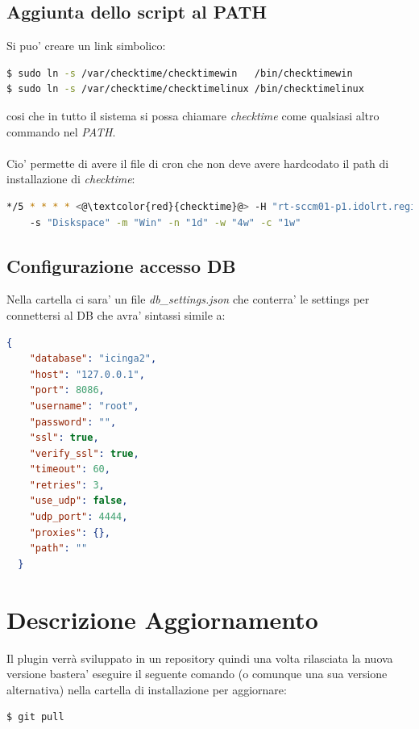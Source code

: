 \documentclass{article}
\begin{document}
\subsection*{Aggiunta dello script al PATH}
Si puo' creare un link simbolico:
\begin{lstlisting}[language=Bash]
$ sudo ln -s /var/checktime/checktimewin   /bin/checktimewin
$ sudo ln -s /var/checktime/checktimelinux /bin/checktimelinux
\end{lstlisting}

cosi che in tutto il sistema si possa chiamare \textit{checktime} come qualsiasi altro commando nel \textit{PATH}.
\\\\
Cio' permette di avere il file di cron che non deve avere hardcodato il path di installazione di \textit{checktime}:

\begin{lstlisting}[language=Bash]
*/5 * * * * <@\textcolor{red}{checktime}@> -H "rt-sccm01-p1.idolrt.regione.toscana.it"
    -s "Diskspace" -m "Win" -n "1d" -w "4w" -c "1w"
\end{lstlisting}

\subsection*{Configurazione accesso DB}

Nella cartella ci sara' un file \textit{db\_settings.json} che conterra' le settings per connettersi al DB che avra' sintassi simile a:

\begin{lstlisting}[language=json]
{
    "database": "icinga2",
    "host": "127.0.0.1",
    "port": 8086,
    "username": "root",
    "password": "",
    "ssl": true,
    "verify_ssl": true,
    "timeout": 60,
    "retries": 3,
    "use_udp": false,
    "udp_port": 4444,
    "proxies": {},
    "path": ""
  }
\end{lstlisting}

\section*{Descrizione Aggiornamento}
Il plugin verrà sviluppato in un repository quindi una volta rilasciata la nuova versione bastera' eseguire il seguente comando (o comunque una sua versione alternativa) nella cartella di installazione per aggiornare:
\begin{lstlisting}[language=Bash]
$ git pull
\end{lstlisting}
\end{document}
